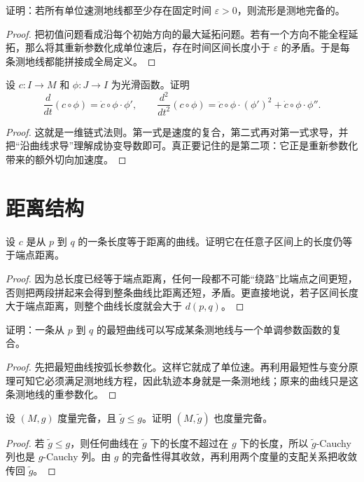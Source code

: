 \documentclass[11pt,a4paper,openany]{ctexbook}
\numberwithin{equation}{chapter}
\begin{document}
\begin{problem}
证明：若所有单位速测地线都至少存在固定时间 \(\varepsilon>0\)，则流形是测地完备的。
\end{problem}
\begin{proof}
把初值问题看成沿每个初始方向的最大延拓问题。若有一个方向不能全程延拓，那么将其重新参数化成单位速后，存在时间区间长度小于 \(\varepsilon\) 的矛盾。于是每条测地线都能拼接成全局定义。
\end{proof}

\begin{problem}
设 \(c\colon I\to M\) 和 \(\phi\colon J\to I\) 为光滑函数。证明
\[
\frac{d}{dt}(c\circ \phi)=\dot c\circ \phi\cdot \phi',\qquad
\frac{d^2}{dt^2}(c\circ \phi)=\ddot c\circ \phi\cdot (\phi')^2+\dot c\circ \phi\cdot \phi''.
\]
\end{problem}
\begin{proof}
这就是一维链式法则。第一式是速度的复合，第二式再对第一式求导，并把“沿曲线求导”理解成协变导数即可。真正要记住的是第二项：它正是重新参数化带来的额外切向加速度。
\end{proof}

\section{距离结构}

\begin{problem}
设 \(c\) 是从 \(p\) 到 \(q\) 的一条长度等于距离的曲线。证明它在任意子区间上的长度仍等于端点距离。
\end{problem}
\begin{proof}
因为总长度已经等于端点距离，任何一段都不可能“绕路”比端点之间更短，否则把两段拼起来会得到整条曲线比距离还短，矛盾。更直接地说，若子区间长度大于端点距离，则整个曲线长度就会大于 \(d(p,q)\)。
\end{proof}

\begin{problem}
证明：一条从 \(p\) 到 \(q\) 的最短曲线可以写成某条测地线与一个单调参数函数的复合。
\end{problem}
\begin{proof}
先把最短曲线按弧长参数化。这样它就成了单位速。再利用最短性与变分原理可知它必须满足测地线方程，因此轨迹本身就是一条测地线；原来的曲线只是这条测地线的重参数化。
\end{proof}

\begin{problem}
设 \((M,g)\) 度量完备，且 \(\tilde g\le g\)。证明 \((M,\tilde g)\) 也度量完备。
\end{problem}
\begin{proof}
若 \(\tilde g\le g\)，则任何曲线在 \(\tilde g\) 下的长度不超过在 \(g\) 下的长度，所以 \(\tilde g\)-Cauchy 列也是 \(g\)-Cauchy 列。由 \(g\) 的完备性得其收敛，再利用两个度量的支配关系把收敛传回 \(\tilde g\)。
\end{proof}
\end{document}
